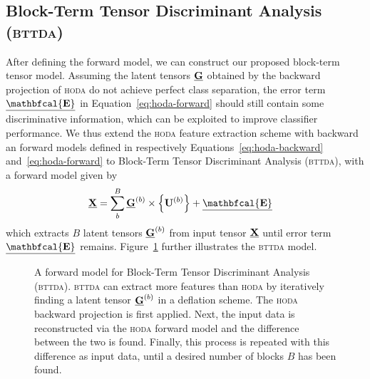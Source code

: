 \documentclass[twocolumn]{article}
\begin{document}
\subsection{Block-Term Tensor Discriminant Analysis (\textsc{bttda})}
After defining the forward model, we can construct our proposed block-term
tensor model. Assuming the latent tensors $\underline{\mathbf{G}}$
obtained by the backward projection of \textsc{hoda} do not achieve perfect
class separation, the error term $\ten{\mathbfcal{E}}$ in
Equation~\ref{eq:hoda-forward} should still contain some discriminative
information, which can be exploited to improve classifier performance.
We thus extend the \textsc{hoda} feature extraction scheme with backward an
forward models defined in respectively Equations~\ref{eq:hoda-backward}
and~\ref{eq:hoda-forward} to Block-Term Tensor Discriminant Analysis
(\textsc{bttda}), with a forward model given by
\begin{align}
  \ten{X} & = \sum_b^B\ten{G}^{(b)}\mmpr{\mat{U}^{(b)}} + \ten{\mathbfcal{E}}
  \label{eq:bttda-forward}
\end{align}
which extracts $B$ latent tensors $\underline{\mathbf{G}}^{(b)}$ from input tensor $\underline{\mathbf{X}}$
until error term $\ten{\mathbfcal{E}}$ remains.
Figure~\ref{fig:bttda} further illustrates the \textsc{bttda} model.
\begin{figure*}
	\centering
	
  \caption{A forward model for Block-Term Tensor Discriminant Analysis
  (\textsc{bttda}). \textsc{bttda} can extract more features
 than \textsc{hoda} by iteratively finding a latent tensor $\underline{\mathbf{G}}^{(b)}$ in a
 deflation scheme.
 The \textsc{hoda} backward projection is first applied. Next, the
 input data is reconstructed via the \textsc{hoda} forward model and the
 difference between the two is found.
 Finally, this process is repeated with this difference as input data, until a
 desired number of blocks $B$ has been found.}
  \label{fig:bttda}
\end{figure*}
\end{document}
